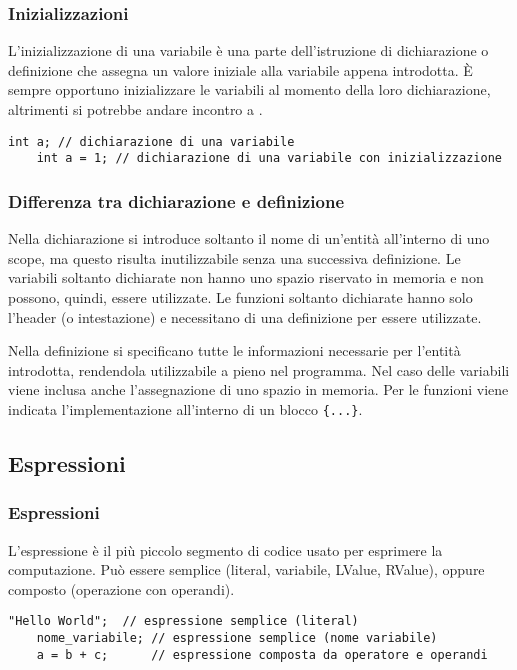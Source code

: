 \documentclass[a4paper]{article}
\begin{document}
\subsubsection*{Inizializzazioni}
L'inizializzazione di una variabile è una parte dell'istruzione di dichiarazione o definizione che assegna un valore iniziale
alla variabile appena introdotta. È sempre opportuno inizializzare le variabili al momento della loro dichiarazione, altrimenti
si potrebbe andare incontro a .
\begin{lstlisting}[numbers=none]
	int a; // dichiarazione di una variabile
	int a = 1; // dichiarazione di una variabile con inizializzazione
\end{lstlisting}

\subsubsection*{Differenza tra dichiarazione e definizione}
Nella dichiarazione si introduce soltanto il nome di un'entità all'interno di uno scope, ma questo risulta inutilizzabile senza
una successiva definizione. Le variabili soltanto dichiarate non hanno uno spazio riservato in memoria e non possono, quindi,
essere utilizzate. Le funzioni soltanto dichiarate hanno solo l'header (o intestazione) e necessitano di una definizione per 
essere utilizzate.

Nella definizione si specificano tutte le informazioni necessarie per l'entità introdotta, rendendola utilizzabile a pieno nel
programma. Nel caso delle variabili viene inclusa anche l'assegnazione di uno spazio in memoria. Per le funzioni viene indicata
l'implementazione all'interno di un blocco \verb|{...}|.

\newpage

\subsection{Espressioni}
\subsubsection*{Espressioni}
L'espressione è il più piccolo segmento di codice usato per esprimere la computazione. Può essere semplice (literal, variabile,
LValue, RValue), oppure composto (operazione con operandi).
\begin{lstlisting}[numbers=none]
	"Hello World";  // espressione semplice (literal)
	nome_variabile; // espressione semplice (nome variabile)
	a = b + c;      // espressione composta da operatore e operandi
\end{lstlisting}
\end{document}
